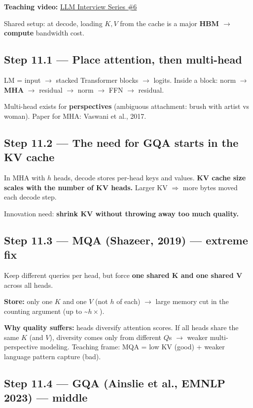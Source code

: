 \documentclass[11pt,a4paper]{article}
\begin{document}
\textbf{Teaching video:} \href{https://www.youtube.com/watch?v=mtsY7JsGQjw}{LLM Interview Series \#6}


Shared setup: at decode, loading \(K,V\) from the cache is a major \textbf{HBM $\rightarrow$ compute} bandwidth cost.


\subsection{Step 11.1 --- Place attention, then multi-head}

LM = input $\rightarrow$ stacked Transformer blocks $\rightarrow$ logits. Inside a block: norm $\rightarrow$ \textbf{MHA} $\rightarrow$ residual $\rightarrow$ norm $\rightarrow$ FFN $\rightarrow$ residual.


Multi-head exists for \textbf{perspectives} (ambiguous attachment: brush with artist vs woman). Paper for MHA: Vaswani et al., 2017.


\subsection{Step 11.2 --- The need for GQA starts in the KV cache}

In MHA with \(h\) heads, decode stores per-head keys and values. \textbf{KV cache size scales with the number of KV heads.} Larger KV $\Rightarrow$ more bytes moved each decode step.


Innovation need: \textbf{shrink KV without throwing away too much quality.}


\subsection{Step 11.3 --- MQA (Shazeer, 2019) --- extreme fix}

Keep different queries per head, but force \textbf{one shared K and one shared V} across all heads.


\textbf{Store:} only one \(K\) and one \(V\) (not \(h\) of each) $\rightarrow$ large memory cut in the counting argument (up to \textasciitilde{}\(h\times\)).


\textbf{Why quality suffers:} heads diversify attention scores. If all heads share the same \(K\) (and \(V\)), diversity comes only from different \(Q\)s $\rightarrow$ weaker multi-perspective modeling. Teaching frame: MQA = low KV (good) + weaker language pattern capture (bad).


\subsection{Step 11.4 --- GQA (Ainslie et al., EMNLP 2023) --- middle}
\end{document}
